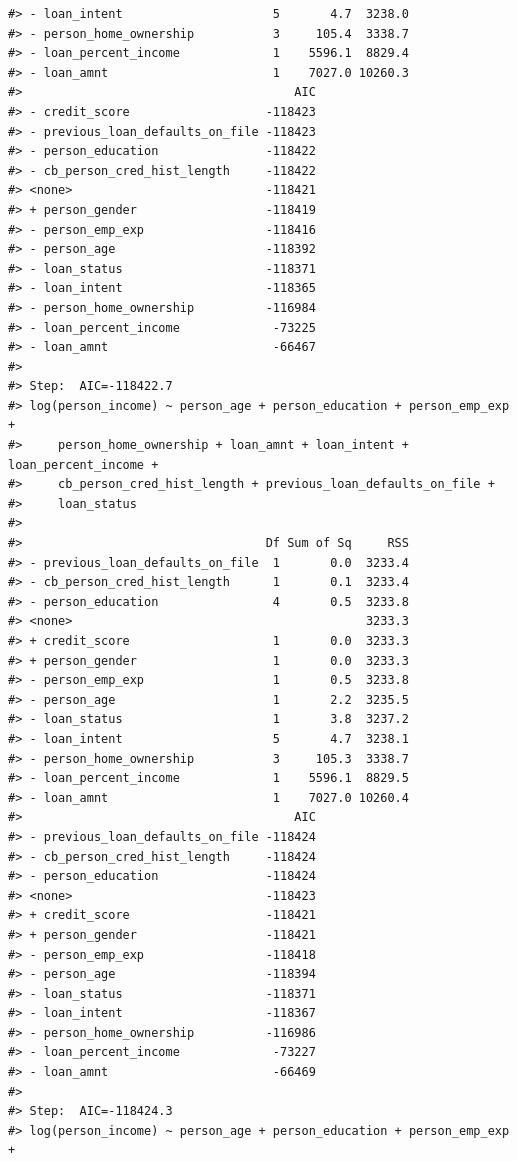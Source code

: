 \documentclass[
  10pt,
]{article}
\begin{document}
\begin{verbatim}
#> - loan_intent                     5       4.7  3238.0
#> - person_home_ownership           3     105.4  3338.7
#> - loan_percent_income             1    5596.1  8829.4
#> - loan_amnt                       1    7027.0 10260.3
#>                                      AIC
#> - credit_score                   -118423
#> - previous_loan_defaults_on_file -118423
#> - person_education               -118422
#> - cb_person_cred_hist_length     -118422
#> <none>                           -118421
#> + person_gender                  -118419
#> - person_emp_exp                 -118416
#> - person_age                     -118392
#> - loan_status                    -118371
#> - loan_intent                    -118365
#> - person_home_ownership          -116984
#> - loan_percent_income             -73225
#> - loan_amnt                       -66467
#> 
#> Step:  AIC=-118422.7
#> log(person_income) ~ person_age + person_education + person_emp_exp + 
#>     person_home_ownership + loan_amnt + loan_intent + loan_percent_income + 
#>     cb_person_cred_hist_length + previous_loan_defaults_on_file + 
#>     loan_status
#> 
#>                                  Df Sum of Sq     RSS
#> - previous_loan_defaults_on_file  1       0.0  3233.4
#> - cb_person_cred_hist_length      1       0.1  3233.4
#> - person_education                4       0.5  3233.8
#> <none>                                         3233.3
#> + credit_score                    1       0.0  3233.3
#> + person_gender                   1       0.0  3233.3
#> - person_emp_exp                  1       0.5  3233.8
#> - person_age                      1       2.2  3235.5
#> - loan_status                     1       3.8  3237.2
#> - loan_intent                     5       4.7  3238.1
#> - person_home_ownership           3     105.3  3338.7
#> - loan_percent_income             1    5596.1  8829.5
#> - loan_amnt                       1    7027.0 10260.4
#>                                      AIC
#> - previous_loan_defaults_on_file -118424
#> - cb_person_cred_hist_length     -118424
#> - person_education               -118424
#> <none>                           -118423
#> + credit_score                   -118421
#> + person_gender                  -118421
#> - person_emp_exp                 -118418
#> - person_age                     -118394
#> - loan_status                    -118371
#> - loan_intent                    -118367
#> - person_home_ownership          -116986
#> - loan_percent_income             -73227
#> - loan_amnt                       -66469
#> 
#> Step:  AIC=-118424.3
#> log(person_income) ~ person_age + person_education + person_emp_exp + 

\end{verbatim}
\end{document}
